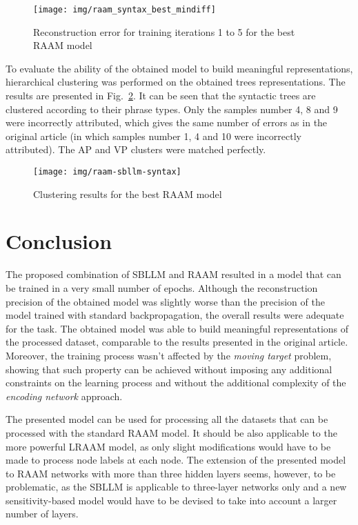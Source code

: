 \documentclass[]{spie}  %
\begin{document}
\begin{figure}[h!]
\begin{center}
	\texttt{[image: img/raam\_syntax\_best\_mindiff]}
	\caption{Reconstruction error for training iterations 1 to 5 for the best RAAM model}
	\label{fig:raam_syntax_best_mindiff}
\end{center}
\end{figure}

To evaluate the ability of the obtained model to build meaningful representations, hierarchical clustering was performed on the obtained trees representations. The results are presented in Fig.~\ref{fig:raam_tree}. It can be seen that the syntactic trees are clustered according to their phrase types. Only the samples number 4, 8 and 9 were incorrectly attributed, which gives the same number of errors as in the original article (in which samples number 1, 4 and 10 were incorrectly attributed). The AP and VP clusters were matched perfectly.


\begin{figure}[h!]
\begin{center}
	\texttt{[image: img/raam-sbllm-syntax]}
	\caption{Clustering results for the best RAAM model}
	\label{fig:raam_tree}
\end{center}
\end{figure}

\section{Conclusion}
The proposed combination of SBLLM and RAAM resulted in a model that can be trained in a very small number of epochs. Although the reconstruction precision of the obtained model was slightly worse than the precision of the model trained with standard backpropagation, the overall results were adequate for the task. The obtained model was able to build meaningful representations of the processed dataset, comparable to the results presented in the original article. Moreover, the training process wasn't affected by the \emph{moving target} problem, showing that such property can be achieved without imposing any additional constraints on the learning process and without the additional complexity of the \emph{encoding network} approach.

The presented model can be used for processing all the datasets that can be processed with the standard RAAM model. It should be also applicable to the more powerful LRAAM model, as only slight modifications would have to be made to process node labels at each node. The extension of the presented model to RAAM networks with more than three hidden layers seems, however, to be problematic, as the SBLLM is applicable to three-layer networks only and a new sensitivity-based model would have to be devised to take into account a larger number of layers.



\end{document}
